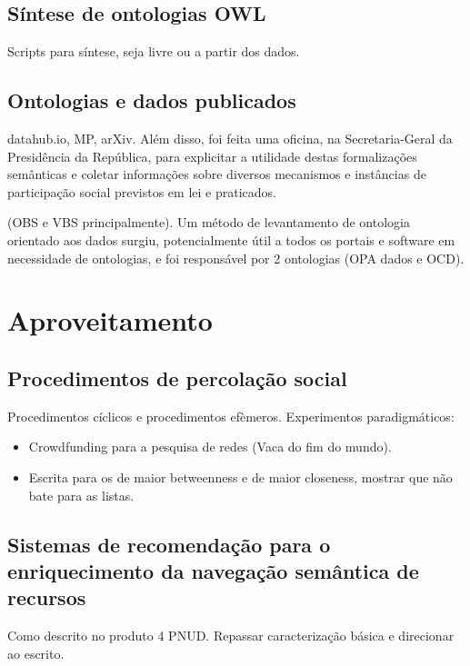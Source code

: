\documentclass[a4paper,openright,12pt]{report} %
\begin{document}
\subsection{Síntese de ontologias OWL}
Scripts para síntese, seja livre ou a partir dos dados.
\subsection{Ontologias e dados publicados}
datahub.io, MP, arXiv.
Além disso, foi feita uma oficina, na Secretaria-Geral da
Presidência da República, para explicitar a utilidade
destas formalizações semânticas e coletar informações sobre
diversos mecanismos e instâncias de participação social previstos
em lei e praticados.

(OBS e VBS principalmente). Um método de levantamento de ontologia orientado aos dados surgiu, potencialmente útil a todos os portais e software em necessidade de ontologias, e foi responsável por 2 ontologias (OPA dados e OCD).


\section{Aproveitamento}
\subsection{Procedimentos de percolação social}
Procedimentos cíclicos e procedimentos efèmeros.
Experimentos paradigmáticos:
\begin{itemize}
	\item Crowdfunding para a pesquisa de redes (Vaca do fim do mundo).
	\item Escrita para os de maior betweenness e de maior closeness, mostrar que não bate para as listas.
\end{itemize}



\subsection{Sistemas de recomendação para o enriquecimento da navegação semântica de recursos}
Como descrito no produto 4 PNUD. Repassar caracterização básica e direcionar ao escrito.
\end{document}
